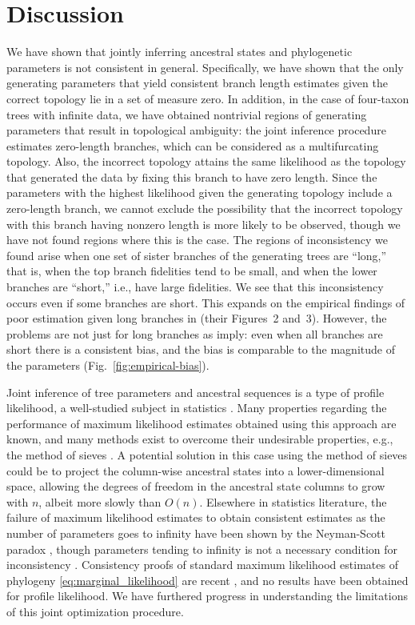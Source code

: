 \documentclass[11pt]{article}
\newcommand{\nCols}{n}
\begin{document}
\section*{Discussion}

We have shown that jointly inferring ancestral states and phylogenetic parameters \citep{Sagulenko2018-xl} is not consistent in general.
Specifically, we have shown that the only generating parameters that yield consistent branch length estimates given the correct topology lie in a set of measure zero.
In addition, in the case of four-taxon trees with infinite data, we have obtained nontrivial regions of generating parameters that result in topological ambiguity: the joint inference procedure estimates zero-length branches, which can be considered as a multifurcating topology.
Also, the incorrect topology attains the same likelihood as the topology that generated the data by fixing this branch to have zero length.
Since the parameters with the highest likelihood given the generating topology include a zero-length branch, we cannot exclude the possibility that the incorrect topology with this branch having nonzero length is more likely to be observed, though we have not found regions where this is the case.
The regions of inconsistency we found arise when one set of sister branches of the generating trees are ``long,'' that is, when the top branch fidelities tend to be small, and when the lower branches are ``short,'' i.e., have large fidelities.
We see that this inconsistency occurs even if some branches are short.
This expands on the empirical findings of poor estimation given long branches in \citet{Sagulenko2018-xl} (their Figures~2 and~3).
However, the problems are not just for long branches as \citet{Sagulenko2018-xl} imply: even when all branches are short there is a consistent bias, and the bias is comparable to the magnitude of the parameters (Fig.~\ref{fig:empirical-bias}).

Joint inference of tree parameters and ancestral sequences is a type of profile likelihood, a well-studied subject in statistics \citep{Murphy2000-ry}.
Many properties regarding the performance of maximum likelihood estimates obtained using this approach are known, and many methods exist to overcome their undesirable properties, e.g., the method of sieves \citep{Geman1982}.
A potential solution in this case using the method of sieves could be to project the column-wise ancestral states into a lower-dimensional space, allowing the degrees of freedom in the ancestral state columns to grow with $\nCols$, albeit more slowly than $O(\nCols)$.
Elsewhere in statistics literature, the failure of maximum likelihood estimates to obtain consistent estimates as the number of parameters goes to infinity have been shown by the Neyman-Scott paradox \citep{Neyman1948-tt}, though parameters tending to infinity is not a necessary condition for inconsistency \citep{LeCam1990}.
Consistency proofs of standard maximum likelihood estimates of phylogeny \eqref{eq:marginal_likelihood} are recent \citep{Allman2008-wd,Chai2011-ff,RoyChoudhury2015-ta}, and no results have been obtained for profile likelihood.
We have furthered progress in understanding the limitations of this joint optimization procedure.
\end{document}
